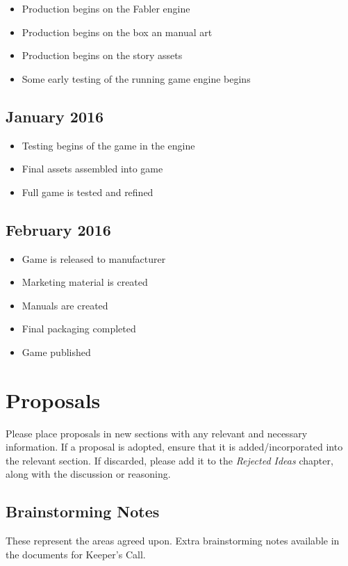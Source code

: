 \documentclass[letterpaper, twoside, 12pt]{memoir}
\begin{document}
\begin{itemize}
\item Production begins on the Fabler engine
\item Production begins on the box an manual art
\item Production begins on the story assets
\item Some early testing of the running game engine begins
\end{itemize}

\section{January 2016}

\begin{itemize}
\item Testing begins of the game in the engine
\item Final assets assembled into game
\item Full game is tested and refined
\end{itemize}

\section{February 2016}
\begin{itemize}
\item Game is released to manufacturer
\item Marketing material is created
\item Manuals are created
\item Final packaging completed
\item Game published
\end{itemize}
\chapter{Proposals}

Please place proposals in new sections with any relevant and necessary information. If a proposal is adopted, ensure that it is added/incorporated into the relevant section. If discarded, please add it to the \textit{Rejected Ideas} chapter, along with the discussion or reasoning.

\section{Brainstorming Notes}

These represent the areas agreed upon. Extra brainstorming notes available in the documents for Keeper's Call.
\end{document}

